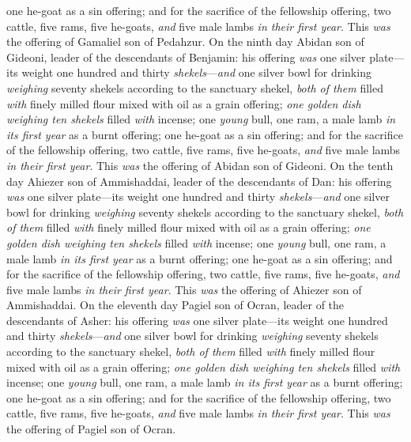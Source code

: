 \begin{biblechapter}
\verse one he-goat as a sin offering;
\verse and for the sacrifice of the fellowship offering, two cattle, five rams, five he-goats, \textit{and} five male lambs \textit{in their first year}. This \textit{was} the offering of Gamaliel son of Pedahzur.
\verse On the ninth day Abidan son of Gideoni, leader of the descendants of Benjamin:
\verse his offering \textit{was} one silver plate—its weight one hundred and thirty \textit{shekels}—\textit{and} one silver bowl for drinking \textit{weighing} seventy shekels according to the sanctuary shekel, \textit{both of them} filled \textit{with} finely milled flour mixed with oil as a grain offering;
\verse \textit{one golden dish weighing ten shekels} filled \textit{with} incense;
\verse one \textit{young} bull, one ram, a male lamb \textit{in its first year} as a burnt offering;
\verse one he-goat as a sin offering;
\verse and for the sacrifice of the fellowship offering, two cattle, five rams, five he-goats, \textit{and} five male lambs \textit{in their first year}. This \textit{was} the offering of Abidan son of Gideoni.
\verse On the tenth day Ahiezer son of Ammishaddai, leader of the descendants of Dan:
\verse his offering \textit{was} one silver plate—its weight one hundred and thirty \textit{shekels}—\textit{and} one silver bowl for drinking \textit{weighing} seventy shekels according to the sanctuary shekel, \textit{both of them} filled \textit{with} finely milled flour mixed with oil as a grain offering;
\verse \textit{one golden dish weighing ten shekels} filled \textit{with} incense;
\verse one \textit{young} bull, one ram, a male lamb \textit{in its first year} as a burnt offering;
\verse one he-goat as a sin offering;
\verse and for the sacrifice of the fellowship offering, two cattle, five rams, five he-goats, \textit{and} five male lambs \textit{in their first year}. This \textit{was} the offering of Ahiezer son of Ammishaddai.
\verse On the eleventh day Pagiel son of Ocran, leader of the descendants of Asher:
\verse his offering \textit{was} one silver plate—its weight one hundred and thirty \textit{shekels}—\textit{and} one silver bowl for drinking \textit{weighing} seventy shekels according to the sanctuary shekel, \textit{both of them} filled \textit{with} finely milled flour mixed with oil as a grain offering;
\verse \textit{one golden dish weighing ten shekels} filled \textit{with} incense;
\verse one \textit{young} bull, one ram, a male lamb \textit{in its first year} as a burnt offering;
\verse one he-goat as a sin offering;
\verse and for the sacrifice of the fellowship offering, two cattle, five rams, five he-goats, \textit{and} five male lambs \textit{in their first year}. This \textit{was} the offering of Pagiel son of Ocran.

\end{biblechapter}
